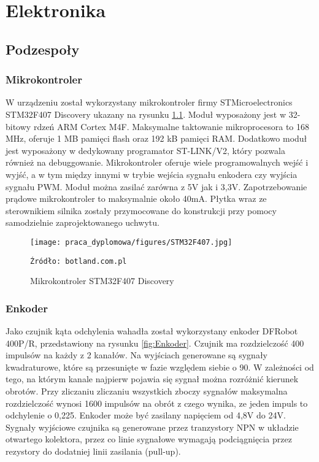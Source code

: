 \chapter{Elektronika}

\section{Podzespoły}
\label{sec:czesci}
\subsection{Mikrokontroler}
\label{sec:STM32}
W urządzeniu został wykorzystany mikrokontroler firmy STMicroelectronics STM32F407 Discovery ukazany na rysunku \ref{fig:STM32}. Moduł wyposażony jest w 32-bitowy rdzeń ARM Cortex M4F. Maksymalne taktowanie mikroprocesora to 168 MHz, oferuje 1 MB pamięci flash oraz 192 kB pamięci RAM. Dodatkowo moduł jest wyposażony w dedykowany programator ST-LINK/V2, który pozwala również na debuggowanie. Mikrokontroler oferuje wiele programowalnych wejść i wyjść, a w tym między innymi w trybie wejścia sygnału enkodera czy wyjścia sygnału PWM. Moduł można zasilać zarówna z 5V jak i 3,3V. Zapotrzebowanie prądowe mikrokontroler to maksymalnie około 40mA. Płytka wraz ze sterownikiem silnika zostały przymocowane do konstrukcji przy pomocy samodzielnie zaprojektowanego uchwytu. 

\begin{figure}
    \centering
    \texttt{[image: praca\_dyplomowa/figures/STM32F407.jpg]}
    \caption{Mikrokontroler STM32F407 Discovery}
    \texttt{Źródło: botland.com.pl}
    \label{fig:STM32}
\end{figure}

\subsection{Enkoder}
Jako czujnik kąta odchylenia wahadła został wykorzystany enkoder DFRobot 400P/R, przedstawiony na rysunku \ref{fig:Enkoder}. Czujnik ma rozdzielczość 400 impulsów na każdy z 2 kanałów. Na wyjściach generowane są sygnały kwadraturowe, które są przesunięte w fazie względem siebie o 90\degree. W zależności od tego, na którym kanale najpierw pojawia się sygnał można rozróżnić kierunek obrotów. Przy zliczaniu zliczaniu wszystkich zboczy sygnałów maksymalna rozdzielczość wynosi 1600 impulsów na obrót z czego wynika, ze jeden impuls to odchylenie o 0,225\degree. Enkoder może być zasilany napięciem od 4,8V do 24V. Sygnały wyjściowe czujnika są generowane przez tranzystory NPN w układzie otwartego kolektora, przez co linie sygnałowe wymagają podciągnięcia przez rezystory do dodatniej linii zasilania (pull-up).

